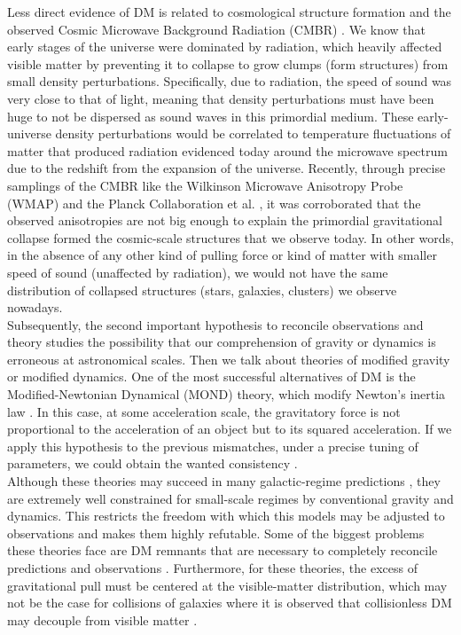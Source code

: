 Less direct evidence of DM is related to cosmological structure formation and the observed Cosmic Microwave Background Radiation (CMBR) \cite{Blumenthal_et_al._1984}. We know that early stages of the universe were dominated by radiation, which heavily affected visible matter by preventing it to collapse to grow clumps (form structures) from small density perturbations. Specifically, due to radiation, the speed of sound was very close to that of light, meaning that density perturbations must have been huge to not be dispersed as sound waves in this primordial medium. These early-universe density perturbations would be correlated to temperature fluctuations of matter that produced radiation evidenced today around the microwave spectrum due to the redshift from the expansion of the universe. Recently, through precise samplings of the CMBR like the Wilkinson Microwave Anisotropy Probe (WMAP) \cite{WMAP_2003,WMAP_2013} and the Planck Collaboration et al. \cite{Planck_Collaboration_2014,Planck_Collaboration_2016}, it was corroborated that the observed anisotropies are not big enough to explain the primordial gravitational collapse formed the cosmic-scale structures that we observe today. In other words, in the absence of any other kind of pulling force or kind of matter with smaller speed of sound (unaffected by radiation), we would not have the same distribution of collapsed structures (stars, galaxies, clusters) we observe nowadays. \\

Subsequently, the second important hypothesis to reconcile observations and theory studies the possibility that our comprehension of gravity or dynamics is erroneous at astronomical scales. Then we talk about theories of modified gravity or modified dynamics. One of the most successful alternatives of DM is the Modified-Newtonian Dynamical (MOND) theory, which modify Newton's inertia law \cite{Milgrom_1983}. In this case, at some acceleration scale, the gravitatory force is not proportional to the acceleration of an object but to its squared acceleration. If we apply this hypothesis to the previous mismatches, under a precise tuning of parameters, we could obtain the wanted consistency \cite{Sanders_and_McGaugh_2002}.\\

Although these theories may succeed in many galactic-regime predictions \cite{Begeman_et_al._1991,McGaugh_and_de_Blok_1998,McGaugh_2012}, they are extremely well constrained for small-scale regimes by conventional gravity and dynamics. This restricts the freedom with which this models may be adjusted to observations and makes them highly refutable. Some of the biggest problems these theories face are DM remnants that are necessary to completely reconcile predictions and observations \cite{Lokas_2002,McGaugh_2015}. Furthermore, for these theories, the excess of gravitational pull must be centered at the visible-matter distribution, which may not be the case for collisions of galaxies where it is observed that collisionless DM may decouple from visible matter \cite{Clowe_et_al._2006}.\\


